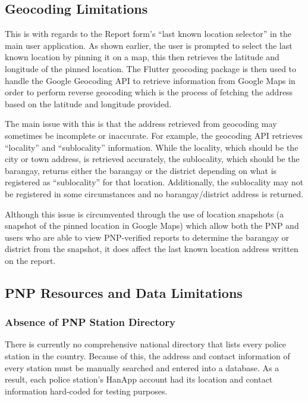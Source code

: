 \subsection{Geocoding Limitations}
\vspace{-1em}

This is with regards to the Report form’s “last known location selector” in the main user application. As shown earlier, the user is prompted to select the last known location by pinning it on a map, this then retrieves the latitude and longitude of the pinned location. The Flutter geocoding package is then used to handle the Google Geocoding API to retrieve information from Google Maps in order to perform reverse geocoding which is the process of fetching the address based on the latitude and longitude provided. 

The main issue with this is that the address retrieved from geocoding may sometimes be incomplete or inaccurate. For example, the geocoding API retrieves “locality” and “sublocality” information. While the locality, which should be the city or town address, is retrieved accurately, the sublocality, which should be the barangay, returns either the barangay or the district depending on what is registered as “sublocality” for that location. Additionally, the sublocality may not be registered in some circumstances and no barangay/district address is returned. 

Although this issue is circumvented through the use of location snapshots (a snapshot of the pinned location in Google Maps) which allow both the PNP and users who are able to view PNP-verified reports to determine the barangay or district from the snapshot, it does affect the last known location address written on the report.

\subsection{PNP Resources and Data Limitations}

\subsubsection{Absence of PNP Station Directory}

There is currently no comprehensive national directory that lists every police station in the country. Because of this, the address and contact information of every station must be manually searched and entered into a database. As a result, each police station’s HanApp account had its location and contact information hard-coded for testing purposes.

